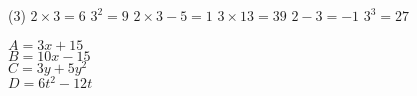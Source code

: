 \begin{correction}
\begin{multicols}{2}
\exo{}


\begin{tasks}[counter-format = {tsk[1].},label-format={\bfseries}](3)
	\task $2\times3=6$ 
	\task $3^2=9$
	\task $2\times3-5=1$
	\task $3\times13=39$
	\task $2-3=-1$
	\task $3^3=27$
\end{tasks}

\exo{}


\begin{multicols}{2}
$A=3x+15$\\
$B=10x-15$\\
$C=3y+5y^2$\\
$D=6t^2-12t$
\end{multicols}

\end{multicols}

	


	
\end{correction}
